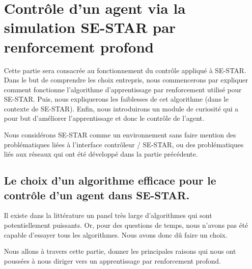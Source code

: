 \section{Contrôle d'un agent via la simulation SE-STAR par renforcement profond}

Cette partie sera consacrée au fonctionnement du contrôle appliqué à SE-STAR. Dans le but de comprendre les choix entrepris, nous commencerons par expliquer comment fonctionne l'algorithme d'apprentissage par renforcement utilisé pour SE-STAR. Puis, nous expliquerons les faiblesses de cet algorithme (dans le contexte de SE-STAR). Enfin, nous introduirons un module de curiosité qui a pour but d'améliorer l'apprentissage et donc le contrôle de l'agent.


Nous considérons SE-STAR comme un environnement sans faire mention des problématiques liées à l'interface contrôleur / SE-STAR, ou des problématiques liés aux réseaux qui ont été développé dans la partie précédente. 

\subsection{Le choix d'un algorithme efficace pour le contrôle d'un agent dans SE-STAR.}

Il existe dans la littérature un panel très large d'algorithmes qui sont potentiellement puissants. Or, pour des questions de temps, nous n'avons pas été capable d'essayer tous les algorithmes. Nous avons donc dû faire un choix. 

Nous allons à travers cette partie, donner les principales raisons qui nous ont poussées à nous diriger vers un apprentissage par renforcement profond. 

